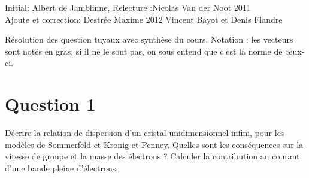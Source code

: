 

\usepackage[utf8x]{inputenc}
\usepackage{ucs}
\usepackage{amsmath}
\usepackage{amsfonts}
\usepackage{amssymb}
\usepackage{graphicx}
\usepackage{color}


{Initial: Albert de Jamblinne, Relecture :Nicolas Van der Noot 2011 \\ Ajoute et correction: Destrée Maxime 2012}
{Vincent Bayot et Denis Flandre}

\newpage

Résolution  des question tuyaux avec synthèse du cours.
Notation : les vecteurs sont notés en gras; si il ne le sont pas, on sous entend que c'est la norme de ceux-ci.
\section{Question 1}
Décrire la relation de dispersion d'un cristal unidimensionnel infini, pour les modèles de Sommerfeld et Kronig et Penney. Quelles sont les conséquences sur la vitesse de groupe et la masse des électrons ? Calculer la contribution au courant d'une bande pleine d'électrons.
\\
\hbox{}
\\
